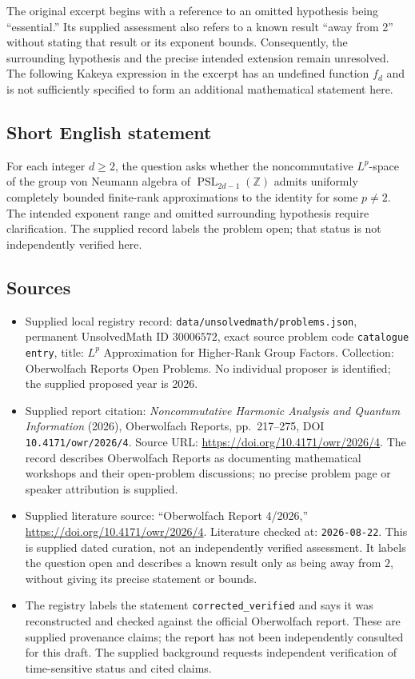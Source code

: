 \documentclass[11pt]{article}
\newcommand{\Z}{\mathbb{Z}}
\begin{document}
The original excerpt begins with a reference to an omitted hypothesis being ``essential.'' Its supplied assessment also refers to a known result ``away from 2'' without stating that result or its exponent bounds. Consequently, the surrounding hypothesis and the precise intended extension remain unresolved. The following Kakeya expression in the excerpt has an undefined function \(f_d\) and is not sufficiently specified to form an additional mathematical statement here.
\subsection{Short English statement}
For each integer \(d\geq2\), the question asks whether the noncommutative \(L^p\)-space of the group von Neumann algebra of \(\operatorname{PSL}_{2d-1}(\Z)\) admits uniformly completely bounded finite-rank approximations to the identity for some \(p\neq2\). The intended exponent range and omitted surrounding hypothesis require clarification. The supplied record labels the problem open; that status is not independently verified here.
\subsection{Sources}
\begin{itemize}
\item Supplied local registry record: \texttt{data/unsolvedmath/problems.json}, permanent UnsolvedMath ID \(30006572\), exact source problem code \texttt{catalogue entry}, title: \(L^p\) Approximation for Higher-Rank Group Factors. Collection: Oberwolfach Reports Open Problems. No individual proposer is identified; the supplied proposed year is 2026.
\item Supplied report citation: \emph{Noncommutative Harmonic Analysis and Quantum Information} (2026), Oberwolfach Reports, pp.\ 217--275, DOI \texttt{10.4171/owr/2026/4}. Source URL: \url{https://doi.org/10.4171/owr/2026/4}. The record describes Oberwolfach Reports as documenting mathematical workshops and their open-problem discussions; no precise problem page or speaker attribution is supplied.
\item Supplied literature source: ``Oberwolfach Report 4/2026,'' \url{https://doi.org/10.4171/owr/2026/4}. Literature checked at: \texttt{2026-08-22}. This is supplied dated curation, not an independently verified assessment. It labels the question open and describes a known result only as being away from \(2\), without giving its precise statement or bounds.
\item The registry labels the statement \texttt{corrected\_verified} and says it was reconstructed and checked against the official Oberwolfach report. These are supplied provenance claims; the report has not been independently consulted for this draft. The supplied background requests independent verification of time-sensitive status and cited claims.
\end{itemize}
\end{document}
